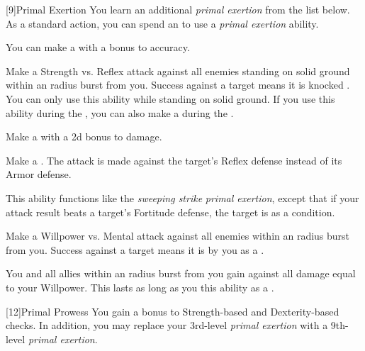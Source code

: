            [9]{Primal Exertion}
            You learn an additional \textit{primal exertion} from the list below.
            As a standard action, you can spend an  to use a \textit{primal exertion} ability.
            {
                 You can make a  with a  bonus to accuracy.

                 Make a Strength vs. Reflex attack against all enemies standing on solid ground within an \areamed radius burst from you.
                Success against a target means it is knocked \prone.
                You can only use this ability while standing on solid ground.
                If you use this ability during the , you can also make a  during the .

                 Make a  with a \plus2d bonus to damage.

                 Make a .
                The attack is made against the target's Reflex defense instead of its Armor defense.

                 This ability functions like the \textit{sweeping strike} \textit{primal exertion}, except that if your attack result beats a target's Fortitude defense, the target is \sickened as a condition.

                Make a Willpower vs. Mental attack against all enemies within an \arealarge radius burst from you.
                Success against a target means it is \frightened by you as a .

                 You and all allies within an \arealarge radius burst from you gain  against all damage equal to your Willpower.
                This lasts as long as you  this ability as a .
            }

            [12]{Primal Prowess}
            You gain a  bonus to Strength-based and Dexterity-based checks.
            In addition, you may replace your 3rd-level \textit{primal exertion} with a 9th-level \textit{primal exertion}.


